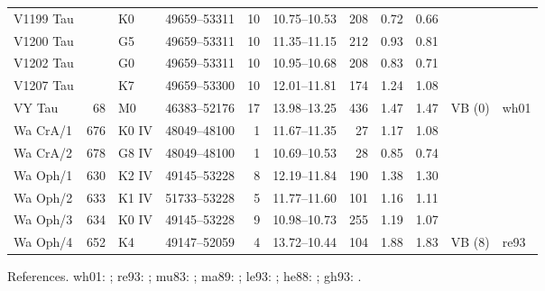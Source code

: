 \begin{table}
{\begin{tabular}{lrllrcrllll}
V1199 Tau &     & K0    & 49659--53311 & 10 & 10.75--10.53 & 208 & 0.72 & 0.66 & & \\
V1200 Tau &     & G5    & 49659--53311 & 10 & 11.35--11.15 & 212 & 0.93 & 0.81 & & \\
V1202 Tau &     & G0    & 49659--53311 & 10 & 10.95--10.68 & 208 & 0.83 & 0.71 & & \\
V1207 Tau &     & K7    & 49659--53300 & 10 & 12.01--11.81 & 174 & 1.24 & 1.08 & & \\
VY Tau    &  68 & M0    & 46383--52176 & 17 & 13.98--13.25 & 436 & 1.47 & 1.47 & VB
(0\farcs66) & wh01 \\
Wa CrA/1  & 676 & K0 IV & 48049--48100 &  1 & 11.67--11.35 &  27 & 1.17 & 1.08 & & \\
Wa CrA/2  & 678 & G8 IV & 48049--48100 &  1 & 10.69--10.53 &  28 & 0.85 & 0.74 & & \\
Wa Oph/1  & 630 & K2 IV & 49145--53228 &  8 & 12.19--11.84 & 190 & 1.38 & 1.30 & & \\
Wa Oph/2  & 633 & K1 IV & 51733--53228 &  5 & 11.77--11.60 & 101 & 1.16 & 1.11 & & \\
Wa Oph/3  & 634 & K0 IV & 49145--53228 &  9 & 10.98--10.73 & 255 & 1.19 & 1.07 & & \\
Wa Oph/4  & 652 & K4    & 49147--52059 &  4 & 13.72--10.44 & 104 & 1.88 & 1.83 & VB
(8\farcs7) & re93 \\
\hline
\end{tabular}}
\medskip
References.
wh01: \citet{white01}; re93: \citet{reipurth93}; mu83:
\citet{mundt83}; ma89: \citet{mathieu89}; le93: \citet{leinert93}; he88: \citet{herbig88}; gh93:
\citet{ghez93}.
\end{table}